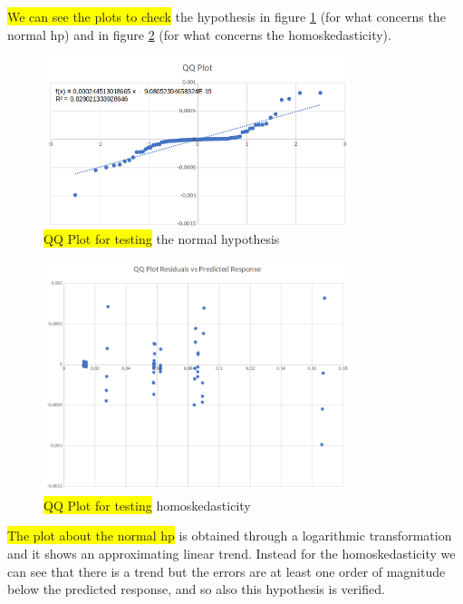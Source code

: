\noindent \colorbox{yellow}{We can see the plots to check} the hypothesis in figure \ref{img: qqplot_responsetime} (for what concerns the normal hp) and in figure \ref{img: homoskedasticity_responsetime} (for what concerns the homoskedasticity).

\begin{figure}[H]
	\centering
	\includegraphics[width=0.8\textwidth]{img/qqplot_2kr_responsetime.png}
	\caption{\colorbox{yellow}{QQ Plot for testing} the normal hypothesis}
	\label {img: qqplot_responsetime}
\end{figure}

\begin{figure}[H]
	\centering
	\includegraphics[width=0.8\textwidth]{img/homoskedasticity_2kr_responsetime.png}
	\caption{\colorbox{yellow}{QQ Plot for testing} homoskedasticity}
	\label {img: homoskedasticity_responsetime}
\end{figure}

\noindent \colorbox{yellow}{The plot about the normal hp} is obtained through a logarithmic transformation and it shows an approximating linear trend. Instead for the homoskedasticity we can see that there is a trend but the errors are at least one order of magnitude below the predicted response, and so also this hypothesis is verified.

